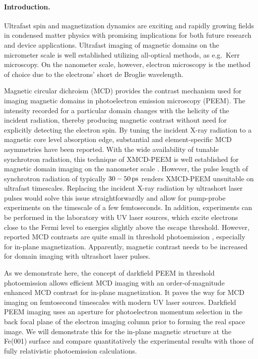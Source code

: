 \documentclass[prl,twocolumn,floatfix,superscriptaddress]{revtex4-2}
\begin{document}
\pacs{}

\maketitle
\paragraph{Introduction.} Ultrafast spin and magnetization dynamics are exciting and rapidly growing fields in condensed matter physics with promising implications for both future research and device applications. Ultrafast imaging of magnetic domains on the micrometer scale is well established utilizing all-optical methods, as e.g.\ Kerr microscopy. On the nanometer scale, however, electron microscopy is the method of choice due to the electrons' short de Broglie wavelength. 

Magnetic circular dichroism (MCD) provides the contrast mechanism used for imaging magnetic domains in photoelectron emission microscopy (PEEM). The intensity recorded for a particular domain changes with the helicity of the incident radiation, thereby producing magnetic contrast without need for explicitly detecting the electron spin. By tuning the incident X-ray radiation to a magnetic core level absorption edge, substantial and element-specific MCD asymmetries have been reported. With the wide availability of tunable synchrotron radiation, this technique of XMCD-PEEM is well established for magnetic domain imaging on the nanometer scale \cite{kuch15}. However, the pulse length of synchrotron radiation of typically $\unit[30-50]{ps}$ renders XMCD-PEEM unsuitable on ultrafast timescales. Replacing the incident X-ray radiation by ultrashort laser pulses would solve this issue straightforwardly and allow for pump-probe experiments on the timescale of a  few femtoseconds. In addition, experiments can be performed in the laboratory with UV laser sources, which excite electrons close to the Fermi level to energies slightly above the escape threshold. However, reported MCD contrasts are quite small in threshold photoemission \cite{marx2000}, especially for in-plane magnetization. Apparently, magnetic contrast needs to be increased for domain imaging with ultrashort laser pulses.

As we demonstrate here, the concept of darkfield PEEM in threshold photoemission allows efficient MCD imaging with an order-of-magnitude enhanced MCD contrast for in-plane magnetization. It paves the way for MCD imaging on femtosecond timescales with modern UV laser sources. Darkfield PEEM imaging uses an aperture for photoelectron momentum selection in the back focal plane of the electron imaging column prior to forming the real space image. We will demonstrate this for the in-plane magnetic structure at the Fe(001) surface and compare quantitatively the experimental results with those of fully relativistic photoemission calculations.
\end{document}
